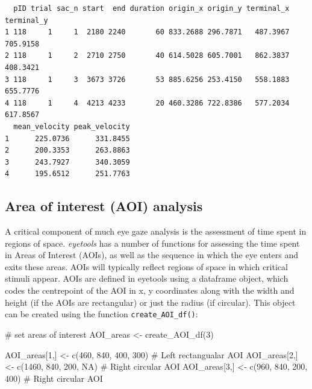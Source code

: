 \documentclass[
  man,
  floatsintext,
  longtable,
  nolmodern,
  notxfonts,
  notimes,
  colorlinks=true,linkcolor=blue,citecolor=blue,urlcolor=blue]{apa7}
\newenvironment{Shaded}{\begin{snugshade}}{\end{snugshade}}
\newcommand{\CommentTok}[1]{\textcolor[rgb]{0.37,0.37,0.37}{#1}}
\newcommand{\ConstantTok}[1]{\textcolor[rgb]{0.56,0.35,0.01}{#1}}
\newcommand{\DecValTok}[1]{\textcolor[rgb]{0.68,0.00,0.00}{#1}}
\newcommand{\FunctionTok}[1]{\textcolor[rgb]{0.28,0.35,0.67}{#1}}
\newcommand{\NormalTok}[1]{\textcolor[rgb]{0.00,0.23,0.31}{#1}}
\newcommand{\OtherTok}[1]{\textcolor[rgb]{0.00,0.23,0.31}{#1}}
\begin{document}
\begin{verbatim}
  pID trial sac_n start  end duration origin_x origin_y terminal_x terminal_y
1 118     1     1  2180 2240       60 833.2688 296.7871   487.3967   705.9158
2 118     1     2  2710 2750       40 614.5028 605.7001   862.3837   408.3421
3 118     1     3  3673 3726       53 885.6256 253.4150   558.1883   655.7776
4 118     1     4  4213 4233       20 460.3286 722.8386   577.2034   617.8567
  mean_velocity peak_velocity
1      225.0736      331.8455
2      200.3353      263.8863
3      243.7927      340.3059
4      195.6512      251.7763
\end{verbatim}

\subsection{Area of interest (AOI)
analysis}\label{area-of-interest-aoi-analysis}

A critical component of much eye gaze analysis is the assessment of time
spent in regions of space. \emph{eyetools} has a number of functions for
assessing the time spent in Areas of Interest (AOIs), as well as the
sequence in which the eye enters and exits these areas. AOIs will
typically reflect regions of space in which critical stimuli appear.
AOIs are defined in eyetools using a dataframe object, which codes the
centrepoint of the AOI in x, y coordinates along with the width and
height (if the AOIs are rectangular) or just the radius (if circular).
This object can be created using the function
\texttt{create\_AOI\_df()}:

\begin{Shaded}
\begin{Highlighting}[]
\CommentTok{\# set areas of interest}
\NormalTok{AOI\_areas }\OtherTok{\textless{}{-}} \FunctionTok{create\_AOI\_df}\NormalTok{(}\DecValTok{3}\NormalTok{)}

\NormalTok{AOI\_areas[}\DecValTok{1}\NormalTok{,] }\OtherTok{\textless{}{-}} \FunctionTok{c}\NormalTok{(}\DecValTok{460}\NormalTok{, }\DecValTok{840}\NormalTok{, }\DecValTok{400}\NormalTok{, }\DecValTok{300}\NormalTok{) }\CommentTok{\# Left rectangualar AOI}
\NormalTok{AOI\_areas[}\DecValTok{2}\NormalTok{,] }\OtherTok{\textless{}{-}} \FunctionTok{c}\NormalTok{(}\DecValTok{1460}\NormalTok{, }\DecValTok{840}\NormalTok{, }\DecValTok{200}\NormalTok{, }\ConstantTok{NA}\NormalTok{) }\CommentTok{\# Right circular AOI}
\NormalTok{AOI\_areas[}\DecValTok{3}\NormalTok{,] }\OtherTok{\textless{}{-}} \FunctionTok{c}\NormalTok{(}\DecValTok{960}\NormalTok{, }\DecValTok{840}\NormalTok{, }\DecValTok{200}\NormalTok{, }\DecValTok{400}\NormalTok{) }\CommentTok{\# Right circular AOI}
\end{Highlighting}
\end{Shaded}
\end{document}

